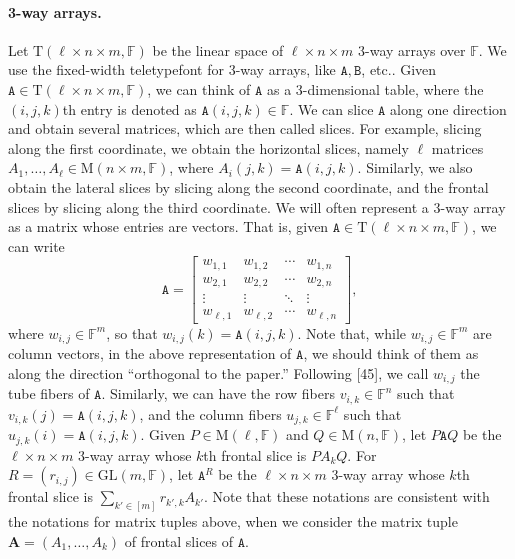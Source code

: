 \documentclass[10pt,a4paper]{article}
\begin{document}
\paragraph{3-way arrays.} Let $\mathrm T(\ell\times n\times m,\mathbb F)$ be the linear space of $\ell\times n\times m$ 3-way arrays over $\mathbb F$. We use the fixed-width teletypefont for 3-way arrays, like $\mathtt A,\mathtt B$, etc..
Given $\mathtt A\in\mathrm T(\ell\times n\times m,\mathbb F)$, we can think of $\mathtt A$ as a 3-dimensional table, where the $(i,j,k)$th entry is denoted as $\mathtt A(i,j,k)\in\mathbb F$. We can slice $\mathtt A$ along one direction and obtain several matrices, which are then called slices. For example, slicing along the first coordinate, we obtain the horizontal slices, namely $\ell$ matrices $A_1,\ldots,A_\ell\in\mathrm M(n\times m,\mathbb F)$, where $A_i(j,k)=\mathtt A(i,j,k)$. Similarly, we also obtain the lateral slices by slicing along the second coordinate, and the frontal slices by slicing along the third coordinate.
We will often represent a 3-way array as a matrix whose entries are vectors. That is, given $\mathtt A\in\mathrm T(\ell\times n\times m,\mathbb F)$, we can write
\[\mathtt A=\begin{bmatrix}w_{1,1}&w_{1,2}&\cdots&w_{1,n}\\w_{2,1}&w_{2,2}&\cdots&w_{2,n}\\\vdots&\vdots&\ddots&\vdots\\w_{\ell,1}&w_{\ell,2}&\cdots&w_{\ell,n}\end{bmatrix},\]
where $w_{i,j}\in\mathbb F^m$, so that $w_{i,j}(k)=\mathtt A(i,j,k)$. Note that, while $w_{i,j}\in\mathbb F^m$ are column vectors, in the above representation of $\mathtt A$, we should think of them as along the direction ``orthogonal to the paper.'' Following [45], we call $w_{i,j}$ the tube fibers of $\mathtt A$. Similarly, we can have the row fibers $v_{i,k}\in\mathbb F^n$ such that $v_{i,k}(j)=\mathtt A(i,j,k)$, and the column fibers $u_{j,k}\in\mathbb F^\ell$ such that $u_{j,k}(i)=\mathtt A(i,j,k)$.
Given $P\in\mathrm M(\ell,\mathbb F)$ and $Q\in\mathrm M(n,\mathbb F)$, let $P\mathtt A Q$ be the $\ell\times n\times m$ 3-way array whose $k$th frontal slice is $PA_kQ$. For $R=(r_{i,j})\in\mathrm{GL}(m,\mathbb F)$, let $\mathtt A^R$ be the $\ell\times n\times m$ 3-way array whose $k$th frontal slice is $\sum_{k'\in[m]}r_{k',k}A_{k'}$. Note that these notations are consistent with the notations for matrix tuples above, when we consider the matrix tuple $\mathbf A=(A_1,\ldots,A_k)$ of frontal slices of $\mathtt A$.
\end{document}
